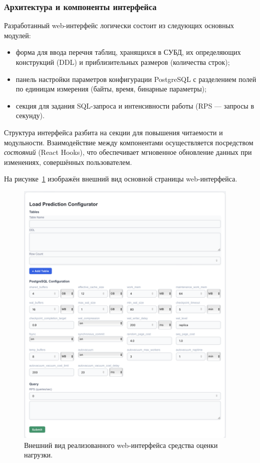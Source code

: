 \subsubsection{Архитектура и компоненты интерфейса}

Разработанный web-интерфейс логически состоит из следующих основных модулей:
\begin{itemize}
    \item форма для ввода перечня таблиц, хранящихся в СУБД, их определяющих конструкций (DDL) и приблизительных размеров (количества строк);
    \item панель настройки параметров конфигурации PostgreSQL с разделением полей по единицам измерения (байты, время, бинарные параметры);
    \item секция для задания SQL-запроса и интенсивности работы (RPS --- запросы в секунду).
\end{itemize}

Структура интерфейса разбита на секции для повышения читаемости и модульности. Взаимодействие между компонентами осуществляется посредством \emph{состояний} (React Hooks), что обеспечивает мгновенное обновление данных при изменениях, совершённых пользователем.

На рисунке~\ref{img:interface} изображён внешний вид основной страницы web-интерфейса.

\begin{figure}[H]
    \centering
    \includegraphics[width=0.95\textwidth]{images/interface.png}
    \caption{Внешний вид реализованного web-интерфейса средства оценки нагрузки.}
    \label{img:interface}
\end{figure}

